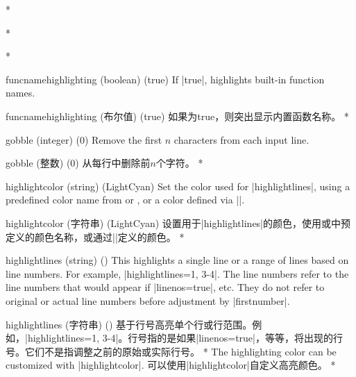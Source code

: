 \begin{optionlist}
\begin{paracol}{2}

 



\switchcolumn[0]*%

    
\switchcolumn

\switchcolumn[0]*%
  










\switchcolumn[0]*%
  \item[funcnamehighlighting (boolean) (true)] 
    If |true|, highlights built-in function names.
    \switchcolumn
    \item[funcnamehighlighting (布尔值) (true)] 
    如果为true，则突出显示内置函数名称。
\switchcolumn[0]*%
  \item[gobble (integer) (0)]
    Remove the first $n$ characters from each input line.
    \switchcolumn
    \item[gobble (整数) (0)]
    从每行中删除前$n$个字符。
    \switchcolumn[0]*%
\item[highlightcolor (string) (LightCyan)]
Set the color used for |highlightlines|, using a predefined color name from  or , or a color defined via |\definecolor|.
\switchcolumn
\item[highlightcolor (字符串) (LightCyan)]
设置用于|highlightlines|的颜色，使用或中预定义的颜色名称，或通过|\definecolor|定义的颜色。
\switchcolumn[0]*%

\item[highlightlines (string) (\meta{none})]
This highlights a single line or a range of lines based on line numbers.  For example, |highlightlines={1, 3-4}|.  The line numbers refer to the line numbers that would appear if |linenos=true|, etc.  They do not refer to original or actual line numbers before adjustment by |firstnumber|.
\switchcolumn
\item[highlightlines (字符串) (\meta{无})]
基于行号高亮单个行或行范围。例如，|highlightlines={1, 3-4}|。行号指的是如果|linenos=true|，等等，将出现的行号。它们不是指调整之前的原始或实际行号。
\switchcolumn[0]*%
The highlighting color can be customized with |highlightcolor|.
\switchcolumn
可以使用|highlightcolor|自定义高亮颜色。
\switchcolumn[0]*%


\end{paracol}
\end{optionlist}
